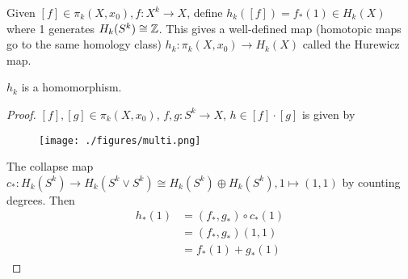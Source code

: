 \documentclass[12pt,class=article,crop=false]{standalone}
\begin{document}
Given $ [f] \in \pi_k(X,x_0), f: X^{k} \to X$, define $ h_k([f]) = f_*(1) \in H_k(X)$ where 1 generates $ H_k(S^{k}) \cong \mathbb{Z}$. This gives a well-defined map (homotopic maps go to the same homology class) $ h_k: \pi_k(X,x_0) \to H_k(X)$ called the Hurewicz map.

\begin{lem}
$ h_k$ is a homomorphism.
\end{lem}
\begin{proof}
	$ [f], [g] \in \pi_k(X,x_0)$, $ f,g: S^{k} \to X$, $ h \in [f] \cdot [g]$ is given by
~\begin{figure}[H]
	\centering
	\texttt{[image: ./figures/multi.png]}
\end{figure}
The collapse map $ c_*: H_k(S^{k}) \to H_k(S^{k} \vee S^{k}) \cong H_k(S^{k}) \oplus H_k(S^{k}), 1 \mapsto (1,1)$ by counting degrees. Then
\begin{align*}
	h_*(1) &= (f_*,g_*) \circ c_*(1) \\
	&= (f_*,g_*)(1,1) \\
	&= f_*(1) + g_*(1)
\end{align*}
\end{proof}
\end{document}
